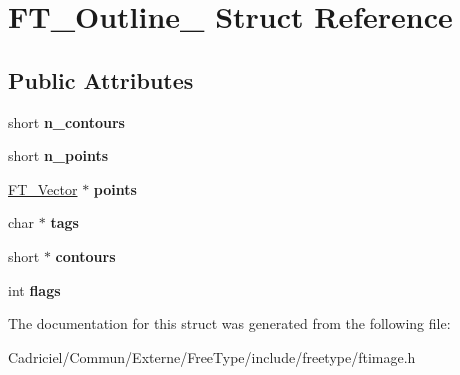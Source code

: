 \hypertarget{struct_f_t___outline__}{\section{F\-T\-\_\-\-Outline\-\_\- Struct Reference}
\label{struct_f_t___outline__}
}
\subsection*{Public Attributes}
\begin{DoxyCompactItemize}
\item 
\hypertarget{struct_f_t___outline___a0313ba9c2c51f10e6b7d7ef97bd946e2}{short {\bfseries n\-\_\-contours}}\label{struct_f_t___outline___a0313ba9c2c51f10e6b7d7ef97bd946e2}

\item 
\hypertarget{struct_f_t___outline___a7ebcf3c33231af88655534d1ac02b66e}{short {\bfseries n\-\_\-points}}\label{struct_f_t___outline___a7ebcf3c33231af88655534d1ac02b66e}

\item 
\hypertarget{struct_f_t___outline___a4871896a2f38bdab947e30a7cf6bca04}{\hyperlink{struct_f_t___vector__}{F\-T\-\_\-\-Vector} $\ast$ {\bfseries points}}\label{struct_f_t___outline___a4871896a2f38bdab947e30a7cf6bca04}

\item 
\hypertarget{struct_f_t___outline___ac84ca66907361e1f49ec11c14720087a}{char $\ast$ {\bfseries tags}}\label{struct_f_t___outline___ac84ca66907361e1f49ec11c14720087a}

\item 
\hypertarget{struct_f_t___outline___a218fdea14003061142ac1045ac50affa}{short $\ast$ {\bfseries contours}}\label{struct_f_t___outline___a218fdea14003061142ac1045ac50affa}

\item 
\hypertarget{struct_f_t___outline___a149765f0be0eab4fc82410cf853964bf}{int {\bfseries flags}}\label{struct_f_t___outline___a149765f0be0eab4fc82410cf853964bf}

\end{DoxyCompactItemize}


The documentation for this struct was generated from the following file\-:\begin{DoxyCompactItemize}
\item 
Cadriciel/\-Commun/\-Externe/\-Free\-Type/include/freetype/ftimage.\-h\end{DoxyCompactItemize}
